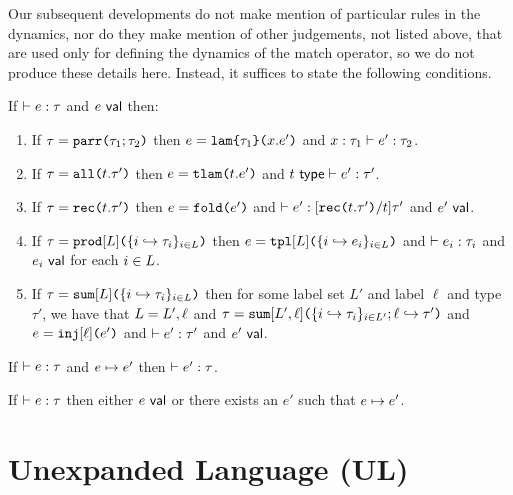 Our subsequent developments do not make mention of particular rules in the dynamics, nor do they make mention of other judgements, not listed above,  that are used only for defining the dynamics of the match operator, so we do not produce these details here. Instead, it suffices to state the following conditions.

\begin{condition}\label{condition:canonical-forms-UP} If $\vdash e : \tau$ and $e~\mathsf{val}$ then:
\begin{enumerate}
\item If $\tau=\texttt{parr}\texttt{(}\tau_1; \tau_2\texttt{)}$ then $e=\texttt{lam}\texttt{\{}\tau_1\texttt{\}(}x.e'\texttt{)}$ and $x : \tau_1 \vdash e' : \tau_2$.
\item If $\tau=\texttt{all}\texttt{(}t.\tau'\texttt{)}$ then $e=\texttt{tlam}\texttt{(}t.e'\texttt{)}$ and $t~\mathsf{type} \vdash e' : \tau'$.
\item If $\tau=\texttt{rec}\texttt{(}t.\tau'\texttt{)}$ then $e=\texttt{fold}\texttt{(}e'\texttt{)}$ and $\vdash e' : [\texttt{rec}\texttt{(}t.\tau'\texttt{)}/t]\tau'$ and $e'~\mathsf{val}$. 
\item If $\tau=\texttt{prod}[L]\texttt{(}\{i \hookrightarrow \tau_{i}\}_{i \in L}\texttt{)}$ then $e=\texttt{tpl}[L]\texttt{(}\{i \hookrightarrow e_{i}\}_{i \in L}\texttt{)}$ and $\vdash e_i : \tau_i$ and $e_i~\mathsf{val}$ for each $i \in L$.
\item If $\tau=\texttt{sum}[L]\texttt{(}\{i \hookrightarrow \tau_{i}\}_{i \in L}\texttt{)}$ then for some label set $L'$ and label $\ell$ and type $\tau'$, we have that $L=L', \ell$ and $\tau=\texttt{sum}[L', \ell]\texttt{(}\{i \hookrightarrow \tau_{i}\}_{i \in L'}; \ell \hookrightarrow \tau'\texttt{)}$ and $e=\texttt{inj}[\ell]\texttt{(}e'\texttt{)}$ and $\vdash e' : \tau'$ and $e'~\mathsf{val}$.
\end{enumerate}\end{condition}


\begin{condition}[Preservation]\label{condition:preservation-UP} If $\vdash e : \tau$ and $e \mapsto e'$ then $\vdash e' : \tau$. \end{condition}

\begin{condition}[Progress]\label{condition:progress-UP} If $\vdash e : \tau$ then either $e~\mathsf{val}$  or there exists an $e'$ such that $e \mapsto e'$. \end{condition}

\section{Unexpanded Language (UL)}\label{appendix:SES-uexps}
